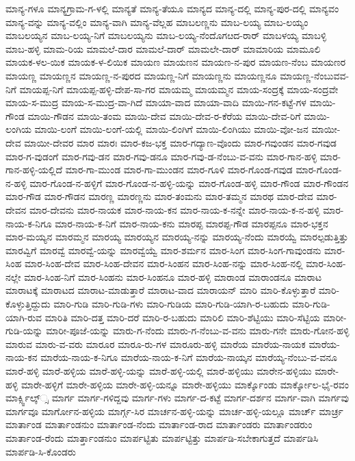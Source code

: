 ಮಾನ್ಯ-ಗಳೂ
ಮಾನ್ಯಗ್ರಾಮ-ಗ-ಳಲ್ಲಿ
ಮಾನ್ಯತೆ
ಮಾನ್ಯ-ತೆಯೂ
ಮಾನ್ಯದ
ಮಾನ್ಯ-ದಲ್ಲಿ
ಮಾನ್ಯ-ಪುರ-ದಲ್ಲಿ
ಮಾನ್ಯವಂ
ಮಾನ್ಯ-ವನ್ನು
ಮಾನ್ಯ-ವಲ್ಲಿಂ
ಮಾನ್ಯ-ವಾಗಿ
ಮಾನ್ಯ-ವೆಲ್ಲಹ
ಮಾಬಲಣ್ಣನು
ಮಾಬ-ಲಯ್ಯ
ಮಾಬ-ಲಯ್ಯಂ
ಮಾಬಲಯ್ಯನ
ಮಾಬ-ಲಯ್ಯ-ನಿಗೆ
ಮಾಬಲಯ್ಯನು
ಮಾಬ-ಲಯ್ಯ-ನೆಂದೊಗೞದ-ರಾರ್
ಮಾಬಳಯ್ಯ
ಮಾಬಳ್ಳಿ
ಮಾಬ-ಹಳ್ಳಿ
ಮಾಮ-ರಿಯ
ಮಾಮಲೆ-ದಾರ
ಮಾಮಲೆ-ದಾರ್
ಮಾಮಲೇ-ದಾರ್
ಮಾಮಾರಿಯ
ಮಾಮೂಲಿ
ಮಾಯಕ-ಳಲ-ಯಿಕ
ಮಾಯಕ-ಳ-ಲಿಯಿಕ
ಮಾಯಣ
ಮಾಯಣನ
ಮಾಯಣ-ನ-ಪುರ
ಮಾಯಣ-ನೆಂಬ
ಮಾಯಣರ
ಮಾಯಣ್ಣ
ಮಾಯಣ್ಣನ
ಮಾಯಣ್ಣ-ನ-ಪುರದ
ಮಾಯಣ್ಣ-ನಿಗೆ
ಮಾಯಣ್ಣನು
ಮಾಯಣ್ಣನೂ
ಮಾಯಣ್ಣ-ನೆಂಬುವವ-ನಿಗೆ
ಮಾಯಪ್ಪ-ನಿಗೆ
ಮಾಯಪ್ಪ-ಹಳ್ಳಿ-ದೇಪ-ಸಾ-ಗರ
ಮಾಯಮ್ಮ
ಮಾಯಮ್ಮನ
ಮಾಯ-ಸಂದ್ರಕ್ಕೆ
ಮಾಯ-ಸಂದ್ರವೇ
ಮಾಯ-ಸ-ಮುದ್ರ
ಮಾಯ-ಸ-ಮುದ್ರ-ವಾ-ಗಿದೆ
ಮಾಯಾ-ವಾದ
ಮಾಯಾ-ವಾದಿ
ಮಾಯಿ-ಗನ-ಕಟ್ಟೆ-ಗಳ
ಮಾಯಿ-ಗೌಂಡ
ಮಾಯಿ-ಗೌಡನ
ಮಾಯಿ-ತಂಮ
ಮಾಯಿ-ದೇವ
ಮಾಯಿ-ದೇವ-ರ-ಕೆರೆಯ
ಮಾಯಿ-ದೇವ-ರಿಗೆ
ಮಾಯಿ-ಲಂಗಿಯ
ಮಾಯಿ-ಲಂಗೆ
ಮಾಯಿ-ಲಂಗೆ-ಯಲ್ಲಿ
ಮಾಯಿ-ಲಿಂಗಿಗೆ
ಮಾಯಿ-ಲಿಂಗಿಯು
ಮಾಯಿ-ವೋ-ಜನ
ಮಾಯೀ-ದೇವ
ಮಾಯೀ-ದೇವರ
ಮಾರ
ಮಾರಃ
ಮಾರ-ಕಜ-ಭಕ್ತ
ಮಾರ-ಗದ್ಯಾಣ-ವೊಂದು
ಮಾರ-ಗವುಂಡನ
ಮಾರ-ಗವುಡ
ಮಾರ-ಗ-ವುಡಂಗೆ
ಮಾರ-ಗವು-ಡನ
ಮಾರ-ಗವು-ಡನೂ
ಮಾರ-ಗವು-ಡ-ನೆಂಬು-ವ-ವನು
ಮಾರ-ಗಾನ-ಹಳ್ಳಿ
ಮಾರ-ಗಾನ-ಹಳ್ಳಿ-ಯಲ್ಲಿದೆ
ಮಾರ-ಗಾ-ಮುಂಡ
ಮಾರ-ಗಾ-ಮುಂಡನ
ಮಾರ-ಗೂಳಿ
ಮಾರ-ಗೊಂಡ-ಗವುಡ
ಮಾರ-ಗೊಂಡ-ನ-ಹಳ್ಳಿ
ಮಾರ-ಗೊಂಡ-ನ-ಹಳ್ಳಿಗೆ
ಮಾರ-ಗೊಂಡ-ನ-ಹಳ್ಳಿ-ಯನ್ನು
ಮಾರ-ಗೊಂಡ-ಹಳ್ಳಿ
ಮಾರ-ಗೌಂಡ
ಮಾರ-ಗೌಂಡನ
ಮಾರ-ಗೌಡ
ಮಾರ-ಗೌಡನ
ಮಾರಣ್ಣ
ಮಾರಣ್ಣನು
ಮಾರ-ತಂಮನು
ಮಾರ-ತಮ್ಮನ
ಮಾರಥ
ಮಾರ-ದೇವ
ಮಾರ-ದೇವನ
ಮಾರ-ದೇವನು
ಮಾರ-ನಾಯಕ
ಮಾರ-ನಾಯ-ಕನ
ಮಾರ-ನಾಯ-ಕ-ನನ್ನೇ
ಮಾರ-ನಾಯ-ಕ-ನ-ಹಳ್ಳಿ
ಮಾರ-ನಾಯ-ಕ-ನಿಗೂ
ಮಾರ-ನಾಯ-ಕ-ನಿಗೆ
ಮಾರ-ನಾಯ-ಕನು
ಮಾರಪ್ಪ
ಮಾರಪ್ಪ-ಗೌಡ
ಮಾರಪ್ಪನೂ
ಮಾರ-ಭಕ್ತನ
ಮಾರ-ಮಯ್ಯನ
ಮಾರಮ್ಮನ
ಮಾರಯ್ಯ
ಮಾರಯ್ಯನ
ಮಾರಯ್ಯ-ನನ್ನು
ಮಾರಯ್ಯ-ನೆಂದು
ಮಾರಯ್ವೆ
ಮಾರಲ್ಪಡುತ್ತಿತ್ತು
ಮಾರವ್ವಿಗೆ
ಮಾರವ್ವೆ
ಮಾರವ್ವೆ-ಯನ್ನು
ಮಾರವ್ವೆಯ್ವೆ
ಮಾರ-ಶರ್ಮನ
ಮಾರ-ಸಿಂಗ
ಮಾರ-ಸಿಂಗ-ಗಾವುಂಡನು
ಮಾರ-ಸಿಂಹ
ಮಾರ-ಸಿಂಹ-ದೇವ
ಮಾರ-ಸಿಂಹ-ದೇವನ
ಮಾರ-ಸಿಂಹನ
ಮಾರ-ಸಿಂಹ-ನನ್ನು
ಮಾರ-ಸಿಂಹ-ನಲ್ಲಿ
ಮಾರ-ಸಿಂಹ-ನಲ್ಲೇ
ಮಾರ-ಸಿಂಹ-ನಿಗೆ
ಮಾರ-ಸಿಂಹನು
ಮಾರ-ಸಿಂಹನೂ
ಮಾರ-ಹಳ್ಳಿ
ಮಾರಾಂಡ
ಮಾರಾಂಡನೂ
ಮಾರಾಟ
ಮಾರಾಟಕ್ಕೆ
ಮಾರಾಟದ
ಮಾರಾಟ-ಮಾಡುತ್ತಾರೆ
ಮಾರಾಟ-ವಾದ
ಮಾರಾಯನ್
ಮಾರಿ
ಮಾರಿ-ಕೊಳ್ಳುತ್ತಾರೆ
ಮಾರಿ-ಕೊಳ್ಳುತ್ತಿದ್ದುದು
ಮಾರಿ-ಗುಡಿ
ಮಾರಿ-ಗುಡಿ-ಗಳು
ಮಾರಿ-ಗುಡಿಯ
ಮಾರಿ-ಗುಡಿ-ಯಾಗಿ-ರ-ಬಹುದು
ಮಾರಿ-ಗುಡಿ-ಯಾಗಿ-ರುವ
ಮಾರಿತಿ
ಮಾರಿ-ದತ್ತ
ಮಾರಿ-ದರೆ
ಮಾರಿ-ರ-ಬಹುದು
ಮಾರಿಲಿ
ಮಾರಿ-ಶೆಟ್ಟಿಯು
ಮಾರಿ-ಸೆಟ್ಟಿಯ
ಮಾರೀ-ಗುಡಿ-ಯನ್ನು
ಮಾರೀ-ಪೂಜೆ-ಯನ್ನು
ಮಾರು-ಗ-ನೆಂದು
ಮಾರು-ಗ-ನೆಂಬು-ವ-ವನು
ಮಾರು-ಗನೇ
ಮಾರು-ಗೋನ-ಹಳ್ಳಿ
ಮಾರುವ
ಮಾರು-ವ-ವರು
ಮಾರೂರ
ಮಾರೂ-ರು-ಗಳ
ಮಾರೂರು-ಹಳ್ಳಿ
ಮಾರೆಯ
ಮಾರೆಯ-ನಾಯಕ
ಮಾರೆಯ-ನಾಯ-ಕನ
ಮಾರೆಯ-ನಾಯ-ಕ-ನಿಗೂ
ಮಾರೆಯ-ನಾಯ-ಕ-ನಿಗೆ
ಮಾರೆಯ-ನಾಯ್ಕನ
ಮಾರೆಯ್ಯ-ನೆಂಬು-ವ-ವನೂ
ಮಾರೆ-ಹಳ್ಳಿ
ಮಾರೆ-ಹಳ್ಳಿಯ
ಮಾರೆ-ಹಳ್ಳಿ-ಯನ್ನು
ಮಾರೆ-ಹಳ್ಳಿ-ಯಲ್ಲಿ
ಮಾರೆ-ಹಳ್ಳಿಯು
ಮಾರೇನ-ಹಳ್ಳಿಯು
ಮಾರೇ-ಹಳ್ಳಿ
ಮಾರೇ-ಹಳ್ಳಿಗೆ
ಮಾರೇ-ಹಳ್ಳಿಯ
ಮಾರೇ-ಹಳ್ಳಿ-ಯನ್ನೂ
ಮಾರೇ-ಹಳ್ಳಿಯು
ಮಾರ್ಕ್ಕೊಂಡು
ಮಾರ್ಕ್ಕೋಲ-ಭೈ-ರವಂ
ಮಾರ್ಕ್ಸ್ವಿಲ್ಕ್್ಸ
ಮಾರ್ಗ
ಮಾರ್ಗ-ಗಳಿದ್ದವು
ಮಾರ್ಗ-ಗಳು
ಮಾರ್ಗ-ದ-ಕಟ್ಟೆ
ಮಾರ್ಗ-ದರ್ಶನ
ಮಾರ್ಗ-ವಾಗಿ
ಮಾರ್ಗವು
ಮಾರ್ಗವೂ
ಮಾರ್ಗೋನ-ಹಳ್ಳಿಯ
ಮಾರ್ಗ್ಗ-ಸಿರ
ಮಾರ್ಚನ-ಹಳ್ಳಿ-ಯನ್ನು
ಮಾರ್ಚ-ಹಳ್ಳಿ-ಯಲ್ಲೂ
ಮಾರ್ಚ್
ಮಾರ್ಚ್ರ
ಮಾರ್ತಾಂಡ
ಮಾರ್ತಾಂಡನುಂ
ಮಾರ್ತಾಂಡ-ನೆಂದು
ಮಾರ್ತಾಂಡ-ರಾದ
ಮಾರ್ತಾಂಡರು
ಮಾರ್ತಾಂಡರುಂ
ಮಾರ್ತಾಂಡ-ರೆಂದು
ಮಾರ್ತ್ತಾಂಡನುಂ
ಮಾರ್ಪಟ್ಟಿತು
ಮಾರ್ಪಟ್ಟಿತ್ತು
ಮಾರ್ಪಡಿ-ಸಬೇಕಾಗುತ್ತದೆ
ಮಾರ್ಪಡಿಸಿ
ಮಾರ್ಪಡಿ-ಸಿ-ಕೊಂಡರು
